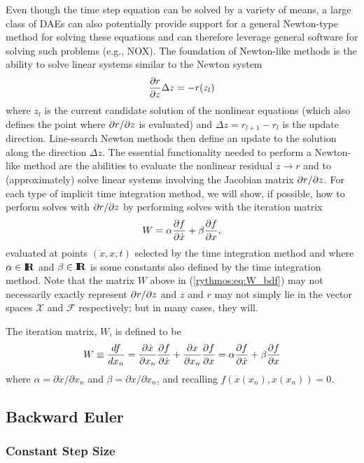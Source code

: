 Even though the time step equation can be solved by a variety of means,
a large class of DAEs can also potentially provide support for a general
Newton-type method for solving these equations and can therefore leverage
general software for solving such problems (e.g., NOX). The foundation
of Newton-like methods is the ability to solve linear systems similar
to the Newton system 
\begin{equation}
\displaystyle{\frac{\partial r}{\partial z}}\Delta z=-r(z_{l})
\end{equation}
where $z_{l}$ is the current candidate solution of the nonlinear
equations (which also defines the point where $\partial r / \partial z$ is evaluated)
and $\Delta z=r_{l+1}-r_{l}$ is the update direction. Line-search
Newton methods then define an update to the solution along the direction
$\Delta z$. The essential functionality needed to perform a Newton-like
method are the abilities to evaluate the nonlinear residual $z{}\rightarrow r$
and to (approximately) solve linear systems involving the Jacobian
matrix $\partial r / \partial z$. For each type of implicit time integration method,
we will show, if possible, how to perform solves with $\partial r / \partial z$
by performing solves with the iteration matrix 
\begin{equation}
W=\alpha\displaystyle{\frac{\partial f}{\partial \dot{x}}}+\beta\displaystyle{\frac{\partial f}{\partial x}},\label{rythmos:eq:W}
\end{equation}
evaluated at points $(\dot{x},x,t)$ selected by the time integration
method and where $\alpha\in\mbox{\textbf{I}}\hspace{-0.6ex}\mbox{\textbf{R}}$ and $\beta\in\mbox{\textbf{I}}\hspace{-0.6ex}\mbox{\textbf{R}}$ is some constants
also defined by the time integration method. Note that the matrix
$W$ above in (\ref{rythmos:eq:W_bdf}) may not necessarily exactly
represent $\partial r / \partial z$ and $z$ and $r$ may not simply lie in the
vector spaces $\mathcal{X}$ and $\mathcal{F}$ respectively; but
in many cases, they will.

The iteration matrix, $W$, is defined to be
\[
W\equiv\frac{df}{dx_{n}}=\frac{\partial\dot{x}}{\partial x_{n}}\displaystyle{\frac{\partial f}{\partial \dot{x}}}+\frac{\partial x}{\partial x_{n}}\displaystyle{\frac{\partial f}{\partial x}}=\alpha\displaystyle{\frac{\partial f}{\partial \dot{x}}}+\beta\displaystyle{\frac{\partial f}{\partial x}}
\]
where $\alpha=\partial\dot{x}/\partial x_{n}$ and $\beta=\partial x/\partial x_{n}$,
and recalling $f\left(\dot{x}(x_{n}),x(x_{n})\right)=0$.

\subsection{Backward Euler}

\subsubsection{Constant Step Size}

